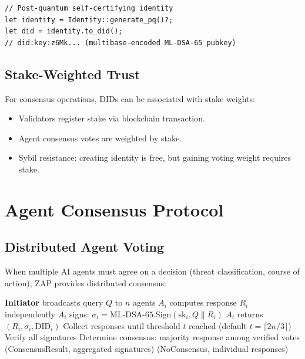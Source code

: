 \documentclass[11pt,letterpaper]{article}
\begin{document}
\begin{lstlisting}[caption={DID generation from ML-DSA public key.}]
// Post-quantum self-certifying identity
let identity = Identity::generate_pq()?;
let did = identity.to_did();
// did:key:z6Mk... (multibase-encoded ML-DSA-65 pubkey)
\end{lstlisting}

\subsection{Stake-Weighted Trust}

For consensus operations, DIDs can be associated with stake weights:

\begin{itemize}
\item Validators register stake via blockchain transaction.
\item Agent consensus votes are weighted by stake.
\item Sybil resistance: creating identity is free, but gaining voting weight requires stake.
\end{itemize}

\section{Agent Consensus Protocol}

\subsection{Distributed Agent Voting}

When multiple AI agents must agree on a decision (threat classification, course of action), ZAP provides distributed consensus:

\begin{algorithm}[H]
\caption{ZAP Agent Consensus}
\begin{algorithmic}[1]
\State \textbf{Initiator} broadcasts query $Q$ to $n$ agents
  \State $A_i$ computes response $R_i$ independently
  \State $A_i$ signs: $\sigma_i = \text{ML-DSA-65.Sign}(\text{sk}_i, Q \| R_i)$
  \State $A_i$ returns $(R_i, \sigma_i, \text{DID}_i)$
\EndFor
\State Collect responses until threshold $t$ reached (default $t = \lceil 2n/3 \rceil$)
\State Verify all signatures
\State Determine consensus: majority response among verified votes
  \State \Return (ConsensusResult, aggregated signatures)
\Else
  \State \Return (NoConsensus, individual responses)
\EndIf
\end{algorithmic}
\end{algorithm}
\end{document}

